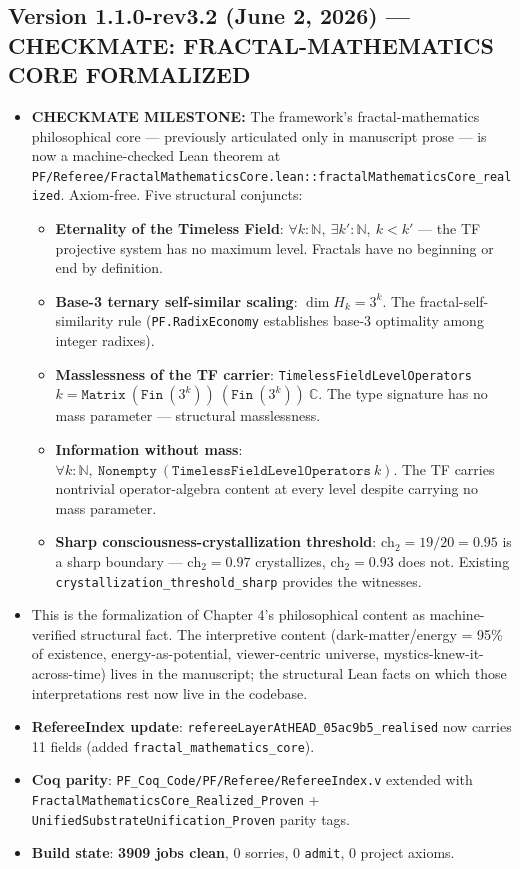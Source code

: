 \subsection*{Version 1.1.0-rev3.2 (June 2, 2026) --- CHECKMATE: FRACTAL-MATHEMATICS CORE FORMALIZED}
\begin{itemize}
\item \textbf{CHECKMATE MILESTONE:} The framework's fractal-mathematics philosophical core --- previously articulated only in manuscript prose --- is now a machine-checked Lean theorem at \texttt{PF/Referee/FractalMathematicsCore.lean::fractalMathematicsCore\_realized}. Axiom-free. Five structural conjuncts:
  \begin{itemize}
  \item \textbf{Eternality of the Timeless Field}: $\forall k : \mathbb{N},\ \exists k' : \mathbb{N},\ k < k'$ --- the TF projective system has no maximum level. Fractals have no beginning or end by definition.
  \item \textbf{Base-3 ternary self-similar scaling}: $\dim H_k = 3^k$. The fractal-self-similarity rule (\texttt{PF.RadixEconomy} establishes base-3 optimality among integer radixes).
  \item \textbf{Masslessness of the TF carrier}: \texttt{TimelessFieldLevelOperators}\ $k = \mathtt{Matrix}\ (\mathtt{Fin}\ (3^k))\ (\mathtt{Fin}\ (3^k))\ \mathbb{C}$. The type signature has no mass parameter --- structural masslessness.
  \item \textbf{Information without mass}: $\forall k : \mathbb{N},\ \mathtt{Nonempty}\ (\mathtt{TimelessFieldLevelOperators}\ k)$. The TF carries nontrivial operator-algebra content at every level despite carrying no mass parameter.
  \item \textbf{Sharp consciousness-crystallization threshold}: $\mathrm{ch}_2 = 19/20 = 0.95$ is a sharp boundary --- $\mathrm{ch}_2 = 0.97$ crystallizes, $\mathrm{ch}_2 = 0.93$ does not. Existing \texttt{crystallization\_threshold\_sharp} provides the witnesses.
  \end{itemize}
\item This is the formalization of Chapter 4's philosophical content as machine-verified structural fact. The interpretive content (dark-matter/energy = 95\% of existence, energy-as-potential, viewer-centric universe, mystics-knew-it-across-time) lives in the manuscript; the structural Lean facts on which those interpretations rest now live in the codebase.
\item \textbf{RefereeIndex update}: \texttt{refereeLayerAtHEAD\_05ac9b5\_realised} now carries 11 fields (added \texttt{fractal\_mathematics\_core}).
\item \textbf{Coq parity}: \texttt{PF\_Coq\_Code/PF/Referee/RefereeIndex.v} extended with \texttt{FractalMathematicsCore\_Realized\_Proven} + \texttt{UnifiedSubstrateUnification\_Proven} parity tags.
\item \textbf{Build state}: \textbf{3909 jobs clean}, 0 sorries, 0 \texttt{admit}, 0 project axioms.
\end{itemize}

